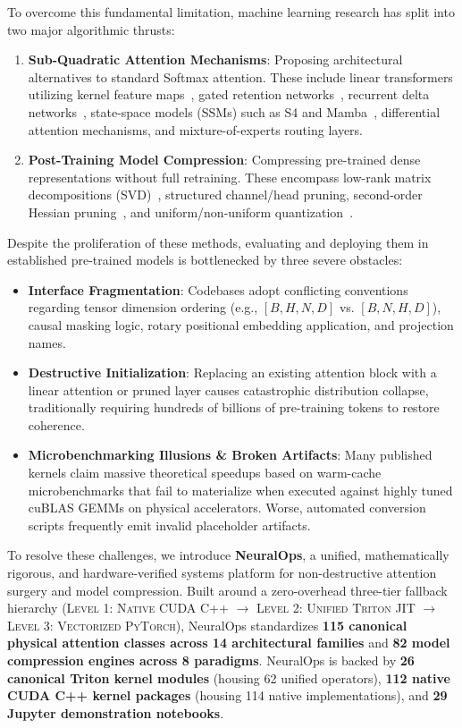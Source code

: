 \documentclass{article}
\begin{document}
To overcome this fundamental limitation, machine learning research has split into two major algorithmic thrusts:
\begin{enumerate}
    \item \textbf{Sub-Quadratic Attention Mechanisms}: Proposing architectural alternatives to standard Softmax attention. These include linear transformers utilizing kernel feature maps~\citep{katharopoulos2020transformers}, gated retention networks~\citep{sun2023retentive}, recurrent delta networks~\citep{schlag2021deltanet}, state-space models (SSMs) such as S4 and Mamba~\citep{gu2023mamba}, differential attention mechanisms, and mixture-of-experts routing layers.
    \item \textbf{Post-Training Model Compression}: Compressing pre-trained dense representations without full retraining. These encompass low-rank matrix decompositions (SVD)~\citep{hu2022lora}, structured channel/head pruning, second-order Hessian pruning~\citep{frantar2023sparsegpt}, and uniform/non-uniform quantization~\citep{dettmers2022llmint8,frantar2023gptq}.
\end{enumerate}

Despite the proliferation of these methods, evaluating and deploying them in established pre-trained models is bottlenecked by three severe obstacles:
\begin{itemize}
    \item \textbf{Interface Fragmentation}: Codebases adopt conflicting conventions regarding tensor dimension ordering (e.g., $[B, H, N, D]$ vs. $[B, N, H, D]$), causal masking logic, rotary positional embedding application, and projection names.
    \item \textbf{Destructive Initialization}: Replacing an existing attention block with a linear attention or pruned layer causes catastrophic distribution collapse, traditionally requiring hundreds of billions of pre-training tokens to restore coherence.
    \item \textbf{Microbenchmarking Illusions \& Broken Artifacts}: Many published kernels claim massive theoretical speedups based on warm-cache microbenchmarks that fail to materialize when executed against highly tuned cuBLAS GEMMs on physical accelerators. Worse, automated conversion scripts frequently emit invalid placeholder artifacts.
\end{itemize}

To resolve these challenges, we introduce \textbf{NeuralOps}, a unified, mathematically rigorous, and hardware-verified systems platform for non-destructive attention surgery and model compression. Built around a zero-overhead three-tier fallback hierarchy (\textsc{Level 1: Native CUDA C++} $\to$ \textsc{Level 2: Unified Triton JIT} $\to$ \textsc{Level 3: Vectorized PyTorch}), NeuralOps standardizes \textbf{115 canonical physical attention classes across 14 architectural families} and \textbf{82 model compression engines across 8 paradigms}. NeuralOps is backed by \textbf{26 canonical Triton kernel modules} (housing 62 unified operators), \textbf{112 native CUDA C++ kernel packages} (housing 114 native implementations), and \textbf{29 Jupyter demonstration notebooks}.
\end{document}
